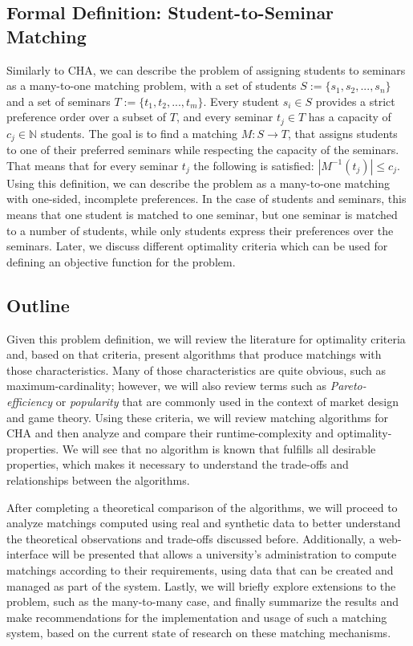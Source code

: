 \subsection{Formal Definition: Student-to-Seminar Matching}
Similarly to CHA, we can describe the problem of assigning students to seminars as a many-to-one matching problem, with a set of students $S:= \{s_1, s_2, ...,s_n\}$ and a set of seminars $T:= \{t_1, t_2, ..., t_m\}$. Every student $s_i \in S$ provides a strict preference order over a subset of $T$, and every seminar $t_j \in T$ has a capacity of $c_j \in \mathbb{N}$ students. The goal is to find a matching $M: S \rightarrow T$, that assigns students to one of their preferred seminars while respecting the capacity of the seminars. That means that for every seminar $t_j$ the following is satisfied: $|M^{-1}(t_j)| \leq c_j$. Using this definition, we can describe the problem as a many-to-one matching with one-sided, incomplete preferences. In the case of students and seminars, this means that one student is matched to one seminar, but one seminar is matched to a number of students, while only students express their preferences over the seminars. Later, we discuss different optimality criteria which can be used for defining an objective function for the problem.

\subsection{Outline}
Given this problem definition, we will review the literature for optimality criteria and, based on that criteria, present algorithms that produce matchings with those characteristics. Many of those characteristics are quite obvious, such as maximum-cardinality; however, we will also review terms such as \emph{Pareto-efficiency} or \emph{popularity} that are commonly used in the context of market design and game theory. 
Using these criteria, we will review matching algorithms for CHA and then analyze and compare their runtime-complexity and optimality-properties. We will see that no algorithm is known that fulfills all desirable properties, which makes it necessary to understand the trade-offs and relationships between the algorithms. 

After completing a theoretical comparison of the algorithms, we will proceed to analyze matchings computed using real and synthetic data to better understand the theoretical observations and trade-offs discussed before. Additionally, a web-interface will be presented that allows a university's administration to compute matchings according to their requirements, using data that can be created and managed as part of the system. Lastly, we will briefly explore extensions to the problem, such as the many-to-many case, and finally summarize the results and make recommendations for the implementation and usage of such a matching system, based on the current state of research on these matching mechanisms.


